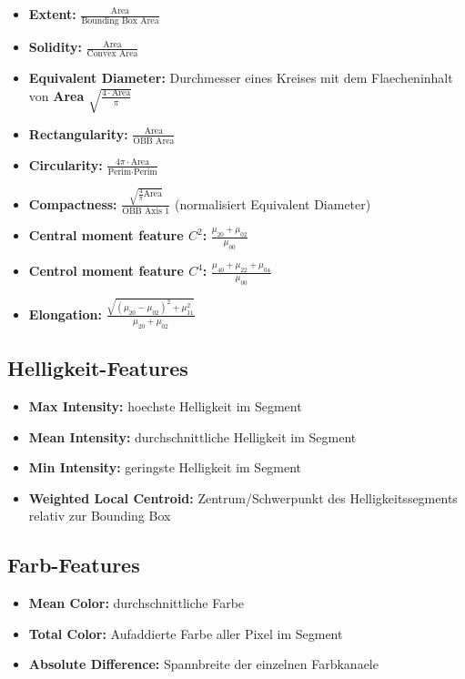 \begin{itemize}
  \item \textbf{Extent:} $\frac{\text{Area}}{\text{Bounding Box Area}}$
  \item \textbf{Solidity:} $\frac{\text{Area}}{\text{Convex Area}}$
  \item \textbf{Equivalent Diameter:} Durchmesser eines Kreises mit dem Flaecheninhalt von \textbf{Area} $\sqrt{\frac{4 \cdot \text{Area}}{\pi}}$
  \item \textbf{Rectangularity:} $\frac{\text{Area}}{\text{OBB Area}}$
  \item \textbf{Circularity:} $\frac{4\pi \cdot \text{Area}}{\text{Perim} \cdot \text{Perim}}$
  \item \textbf{Compactness:} $\frac{\sqrt{\frac{4}{\pi}\text{Area}}}{\text{OBB Axis 1}}$ (normalisiert Equivalent Diameter)
  \item \textbf{Central moment feature $C^2$:} $\frac{\mu_{20} + \mu_{02}}{\mu_{00}}$ 
  \item \textbf{Centrol moment feature $C^4$:} $\frac{\mu_{40} + \mu_{22} + \mu_{04}}{\mu_{00}}$
  \item \textbf{Elongation:} $\frac{\sqrt{(\mu_{20} - \mu_{02})^2 + \mu^2_{11}}}{\mu_{20} + \mu_{02}}$
\end{itemize}

\subsection{Helligkeit-Features}

\begin{itemize}
  \item \textbf{Max Intensity:} hoechste Helligkeit im Segment
  \item \textbf{Mean Intensity:} durchschnittliche Helligkeit im Segment
  \item \textbf{Min Intensity:} geringste Helligkeit im Segment
  \item \textbf{Weighted Local Centroid:} Zentrum/Schwerpunkt des Helligkeitssegments relativ zur Bounding Box
\end{itemize}

\subsection{Farb-Features}

\begin{itemize}
  \item \textbf{Mean Color:} durchschnittliche Farbe
  \item \textbf{Total Color:} Aufaddierte Farbe aller Pixel im Segment
  \item \textbf{Absolute Difference:} Spannbreite der einzelnen Farbkanaele
\end{itemize}

